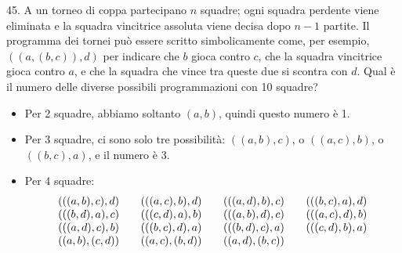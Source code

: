 \begin{problem}{45.}
	A un torneo di coppa partecipano $n$ squadre; ogni squadra perdente viene eliminata e la squadra vincitrice assoluta viene decisa dopo $n-1$ partite.
	Il programma dei tornei può essere scritto simbolicamente come, per esempio, $((a,(b,c)),d)$ per indicare che $b$ gioca contro $c$, che la squadra vincitrice gioca contro $a$, e che la squadra che vince  tra queste due si scontra con $d$.
	Qual è il numero delle diverse possibili programmazioni con 10 squadre?
	\begin{itemize}
		\item Per 2 squadre, abbiamo soltanto $(a,b)$, quindi questo numero è 1.
		\item Per 3 squadre, ci sono solo tre possibilità: $((a,b),c)$, o $((a,c),b)$, o $((b,c),a)$, e il numero è 3.
		\item Per 4 squadre:
			\begin{equation*}
				\begin{array}{@{}cccc@{}}
					(((a,b),c),d) & \quad\;(((a,c),b),d) & \quad\;(((a,d),b),c) & \quad\;(((b,c),a),d) \\
					(((b,d),a),c) & \quad\;(((c,d),a),b) & \quad\;(((a,b),d),c) & \quad\;(((a,c),d),b) \\
					(((a,d),c),b) & \quad\;(((b,c),d),a) & \quad\;(((b,d),c),a) & \quad\;(((c,d),b),a) \\
					((a,b),(c,d)) & \quad\;((a,c),(b,d)) & \quad\;((a,d),(b,c))
				\end{array}
			\end{equation*}
	\end{itemize}
\end{problem}

